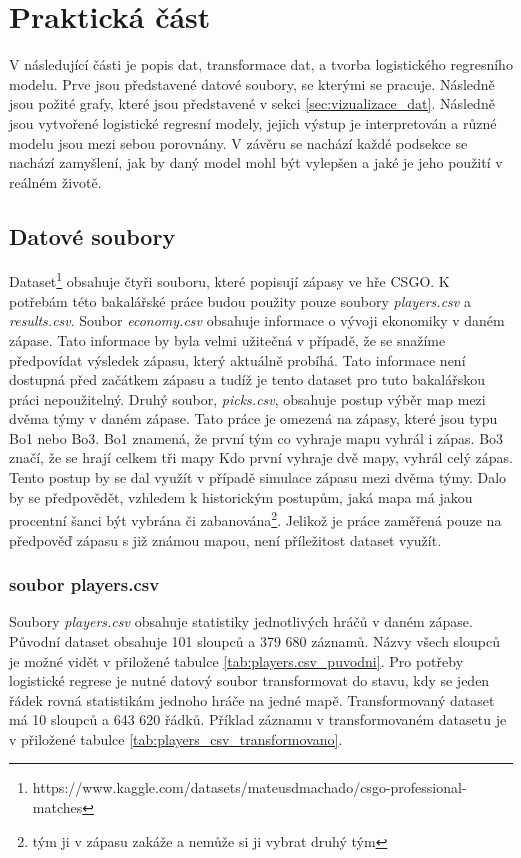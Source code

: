 \chapter{Praktická část}
V následující části je popis dat, transformace dat, a tvorba logistického regresního modelu. Prve jsou představené datové soubory,
se kterými se pracuje. Následně jsou požité grafy, které jsou představené v sekci \ref{sec:vizualizace_dat}. Následně jsou vytvořené
logistické regresní modely, jejich výstup je interpretován a různé modelu jsou mezi sebou porovnány. V závěru se nachází každé podsekce
se nachází zamyšlení, jak by daný model mohl být vylepšen a jaké je jeho použití v reálném životě.

\section{Datové soubory}
Dataset\footnote{https://www.kaggle.com/datasets/mateusdmachado/csgo-professional-matches} obsahuje čtyři souboru, které popisují zápasy ve hře
\ac{CSGO}. K potřebám této bakalářské práce budou použity pouze soubory \textit{players.csv} a \textit{results.csv}. Soubor \textit{economy.csv} obsahuje
informace o vývoji ekonomiky v daném zápase. Tato informace by byla velmi užitečná v případě, že se snažíme předpovídat výsledek zápasu, který aktuálně probíhá.
Tato informace není dostupná před začátkem zápasu a tudíž je tento dataset pro tuto bakalářskou práci nepoužitelný. Druhý soubor, \textit{picks.csv}, obsahuje
postup výběr map mezi dvěma týmy v daném zápase. Tato práce je omezená na zápasy, které jsou typu Bo1 nebo Bo3. Bo1 znamená, že první tým co vyhraje mapu vyhrál i zápas.
Bo3 značí, že se hrají celkem tři mapy Kdo první vyhraje dvě mapy, vyhrál celý zápas. Tento postup by se dal využít v případě simulace zápasu mezi dvěma týmy. Dalo by 
se předpovědět, vzhledem k historickým postupům, jaká mapa má jakou procentní šanci být vybrána či zabanována\footnote{tým ji v zápasu zakáže a nemůže si ji vybrat druhý tým}.
Jelikož je práce zaměřená pouze na předpověď zápasu s již známou mapou, není příležitost dataset využít.

\subsection{soubor players.csv}
Soubory \textit{players.csv} obsahuje statistiky jednotlivých hráčů v daném zápase. Původní dataset obsahuje 101 sloupců a 379 680 záznamů.
Názvy všech sloupců je možné vidět v přiložené tabulce \ref{tab:players.csv_puvodni}. Pro potřeby logistické regrese je nutné datový soubor transformovat do stavu,
kdy se jeden řádek rovná statistikám jednoho hráče na jedné mapě. Transformovaný dataset má 10 sloupců a 643 620 řádků. Příklad záznamu v transformovaném
datasetu je v přiložené tabulce \ref{tab:players_csv_transformovano}.

